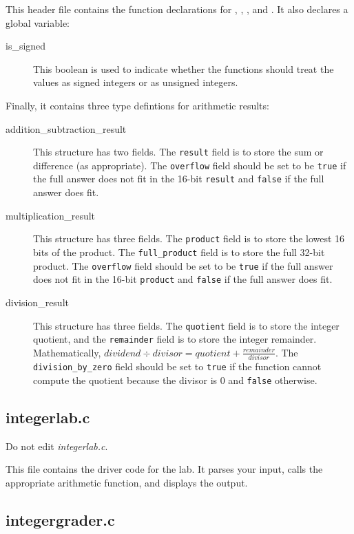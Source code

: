 This header file contains the function declarations for ,
, , and .  It also
declares a global variable:
\begin{description}
\item[is\_signed] This boolean is used to indicate whether the functions should
    treat the values as signed integers or as unsigned integers.
\end{description}
Finally, it contains three type defintions for arithmetic results:
\begin{description}
\item[addition\_subtraction\_result] This structure has two fields. The
    \lstinline{result} field is to store the sum or difference (as
    appropriate). The \lstinline{overflow} field should be set to be
    \lstinline{true} if the full answer does not fit in the 16-bit
    \lstinline{result} and \lstinline{false} if the full answer does fit.
\item[multiplication\_result] This structure has three fields. The
    \lstinline{product} field is to store the lowest 16 bits of the product. The
    \lstinline{full_product} field is to store the full 32-bit product. The
    \lstinline{overflow} field should be set to be \lstinline{true} if the full
    answer does not fit in the 16-bit \lstinline{product} and \lstinline{false}
    if the full answer does fit.
\item[division\_result] This structure has three fields. The
    \lstinline{quotient} field is to store the integer quotient, and the
    \lstinline{remainder} field is to store the integer remainder.
    Mathematically, $dividend \div divisor = quotient +
    \frac{remainder}{divisor}$. The \lstinline{division_by_zero} field should
    be set to \texttt{true} if the  function cannot compute
    the quotient because the divisor is 0 and \lstinline{false} otherwise.
\end{description}

\subsection{integerlab.c}

Do not edit \textit{integerlab.c}.

This file contains the driver code for the lab.  It parses your input, calls
the appropriate arithmetic function, and displays the output.

\subsection{integergrader.c}

